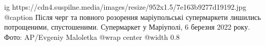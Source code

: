  
 
 
 
 

\ifcmt
  ig https://cdn4.suspilne.media/images/resize/952x1.5/7e163b9277d19192.jpg
	@caption Після черг та повного розорення маріупольські супермаркети лишились потрощеними, спустошеними. Супермаркет у Маріуполі, 6 березня 2022 року. Фото: AP/Evgeniy Maloletka
  @wrap center
  @width 0.8
\fi


